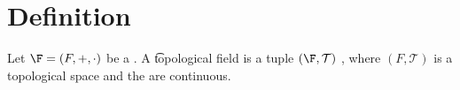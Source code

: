 
\section*{Definition}

Let $\F  = (F, +, \cdot )$ be a .
A \t{topological field} is a tuple $(\F , \mathcal{T} )$ , where $(F, \mathcal{T} )$ is a topological space and the are continuous.
